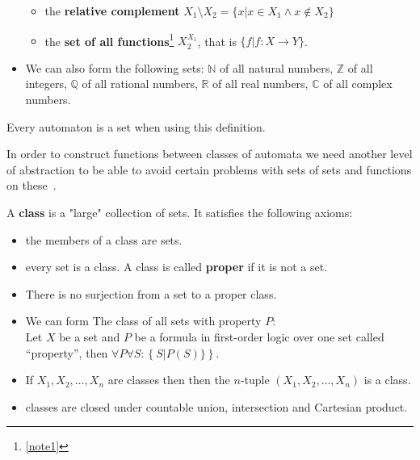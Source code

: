 \begin{definition}[Set]
\begin{itemize}
\begin{itemize}
                     \item the \textbf{relative complement} $X_1 \setminus X_2 = \{ x | x \in X_1 \wedge x \not\in X_2 \}$
                     
                     \item the \textbf{set of all functions}\footnote{\ref{note1}} $X_2^{X_1}$, that is $\{f | f: X \rightarrow Y\}$.
                    \end{itemize}
                    
                    \item We can also form the following sets: $\mathbb{N}$ of all natural numbers, $\mathbb{Z}$ of all integers, $\mathbb{Q}$ of all rational numbers, $\mathbb{R}$ of all real numbers, $\mathbb{C}$ of all complex numbers.
             \end{itemize}
            \end{definition}
            
            Every automaton is a set when using this definition. 
            
            In order to construct functions between classes of automata we need another level of abstraction to be able to avoid certain problems with sets of sets and functions on these~\autocite{CT2}.
            \begin{definition}\label{class}
             A \textbf{class} is a "large" collection of sets. It satisfies the following axioms:
             \begin{itemize}
                \item the members of a class are sets.
                \item every set is a class. A class is called \textbf{proper} if it is not a set.
                \item There is no surjection from a set to a proper class.
                \item We can form The class of all sets with property $P$: \\
                    Let $X$ be a set and $P$ be a formula in first-order logic over one set called "`property"', then $\forall P \forall S: \left\{ S | P(S) \} \right\}$.
                 \item If $X_1, X_2, \dots, X_n$ are classes then then the $n$-tuple $(X_1, X_2, \dots, X_n)$ is a class.
                 \item classes are closed under countable union, intersection and Cartesian product.
             \end{itemize}
            \end{definition}
            
